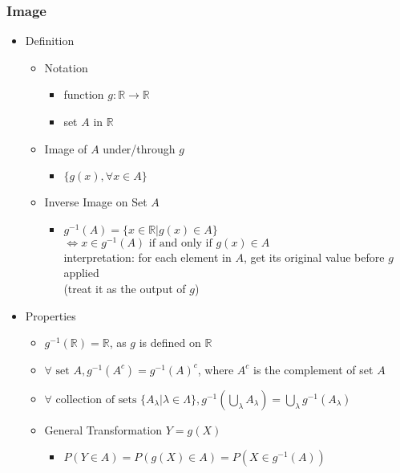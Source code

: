 \subsubsection{Image}
\begin{itemize}
\item Definition
	\begin{itemize}
	\item Notation
		\begin{itemize}
		\item function $g:\mathbb{R} \rightarrow \mathbb{R}$
		\item set $A$ in $\mathbb{R}$
		\end{itemize}
	\item Image of $A$ under/through $g$
		\begin{itemize}
		\item $\{g(x), \forall x\in A\}$ 
		\end{itemize}
	\item Inverse Image on Set $A$
		\begin{itemize}
		\item $\displaystyle g^{-1}(A) = \{x\in\mathbb{R}|g(x)\in A\}$ \\ 
		$\Leftrightarrow x\in g^{-1}(A) \text{ if and only if } g(x) \in A$ \\
		interpretation: for each element in $A$, get its original value before $g$ applied \\
		(treat it as the output of $g$)
		\end{itemize}
	\end{itemize}
\item Properties
	\begin{itemize}
	\item $g^{-1}(\mathbb{R}) = \mathbb{R}$, as $g$ is defined on $\mathbb{R}$
	\item $\forall \text{ set } A, g^{-1}(A^c) = g^{-1}(A)^c$, where $A^c$ is the complement of set $A$
	\item $\displaystyle \forall \text{ collection of sets } \{A_\lambda | \lambda \in \Lambda\}, g^{-1}\left( \bigcup_\lambda A_\lambda \right) = \bigcup_\lambda g^{-1}(A_\lambda)$
	\item General Transformation $Y=g(X)$
		\begin{itemize}
		\item $P(Y\in A) = P(g(X)\in A) = P(X \in g^{-1}(A))$
		\end{itemize}
	\end{itemize}
\end{itemize}

